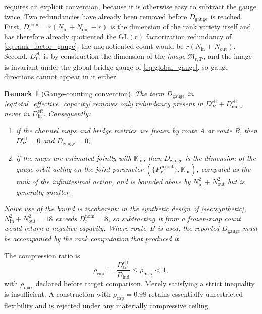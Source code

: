 \documentclass[11pt]{article}
\newtheorem{remark}{Remark}
\begin{document}
 requires an explicit convention, because it is otherwise easy to subtract the gauge twice. Two redundancies have already been removed before \(D_{\mathrm{gauge}}\) is reached. First, \(D_r^{\mathrm{nom}}=r(N_{\mathrm{in}}+N_{\mathrm{out}}-r)\) is the dimension of the rank variety itself and has therefore already quotiented the \(\mathrm{GL}(r)\) factorization redundancy of \cref{eq:rank_factor_gauge}; the unquotiented count would be \(r(N_{\mathrm{in}}+N_{\mathrm{out}})\). Second, \(D_{\mathrm{br}}^{\mathrm{eff}}\) is by construction the dimension of the \emph{image} \(\mathfrak M_{r,\mathbf P}\), and the image is invariant under the global bridge gauge of \cref{eq:global_gauge}, so gauge directions cannot appear in it either.

\begin{remark}[Gauge-counting convention]
\label{rem:gauge_counting}
The term \(D_{\mathrm{gauge}}\) in \cref{eq:total_effective_capacity} removes only redundancy present in \(D_{P}^{\mathrm{eff}}+D_{\mathrm{nuis}}^{\mathrm{eff}}\), never in \(D_{\mathrm{br}}^{\mathrm{eff}}\). Consequently:
\begin{enumerate}[leftmargin=1.55em]
\item if the channel maps and bridge metrics are frozen by route A or route B, then \(D_{P}^{\mathrm{eff}}=0\) and \(D_{\mathrm{gauge}}=0\);
\item if the maps are estimated jointly with \(\mathbb K_{\mathrm{br}}\), then \(D_{\mathrm{gauge}}\) is the dimension of the gauge orbit acting on the \emph{joint} parameter \((\{P_{\chi}^{\mathrm{in/out}}\},\mathbb K_{\mathrm{br}})\), computed as the rank of the infinitesimal action, and is bounded above by \(N_{\mathrm{in}}^{2}+N_{\mathrm{out}}^{2}\) but is generally smaller.
\end{enumerate}
Naive use of the bound is incoherent: in the synthetic design of \cref{sec:synthetic}, \(N_{\mathrm{in}}^{2}+N_{\mathrm{out}}^{2}=18\) exceeds \(D_r^{\mathrm{nom}}=8\), so subtracting it from a frozen-map count would return a negative capacity. Where route~B is used, the reported \(D_{\mathrm{gauge}}\) must be accompanied by the rank computation that produced it.
\end{remark}

The compression ratio is
\begin{equation}
\boxed{
\rho_{\mathrm{cap}}
:=\frac{D_{\mathrm{tot}}^{\mathrm{eff}}}{D_{\mathrm{ind}}}
\le\rho_{\max}<1,
}
\label{eq:compression_ratio}
\end{equation}
with \(\rho_{\max}\) declared before target comparison. Merely satisfying a strict inequality is insufficient. A construction with \(\rho_{\mathrm{cap}}=0.98\) retains essentially unrestricted flexibility and is rejected under any materially compressive ceiling.
\end{document}
